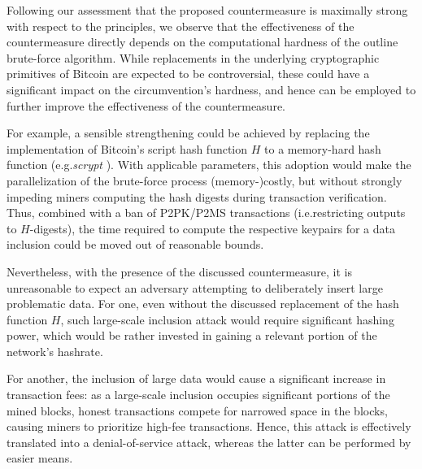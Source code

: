 \documentclass[a4paper,11pt,titlepage]{scrbook}
\begin{document}
Following our assessment that the proposed countermeasure is maximally strong with respect to the principles, we observe that the effectiveness of the countermeasure directly depends on the computational hardness of the outline brute-force algorithm.
While replacements in the underlying cryptographic primitives of Bitcoin are expected to be controversial, 
these could have a significant impact on the circumvention's hardness, and hence can be employed to further improve the effectiveness of the countermeasure.

For example, a sensible strengthening could be achieved by replacing the implementation of Bitcoin's script hash function $H$ to a memory-hard hash function (e.g.\@ \emph{scrypt} \cite{percival_scrypt}).
With applicable parameters, this adoption would make the parallelization of the brute-force process (memory-)costly, but without strongly impeding miners computing the hash digests during transaction verification.
Thus, combined with a ban of P2PK/P2MS transactions (i.e.\@ restricting outputs to $H$-digests), the time required to compute the respective keypairs for a data inclusion could be moved out of reasonable bounds.


Nevertheless, with the presence of the discussed countermeasure, it is unreasonable to expect an adversary attempting to deliberately insert large problematic data.
For one, even without the discussed replacement of the hash function $H$, such large-scale inclusion attack would require significant hashing power, which would be rather invested in gaining a relevant portion of the network's hashrate.

For another, the inclusion of large data would cause a significant increase in transaction fees:
as a large-scale inclusion occupies significant portions of the mined blocks, honest transactions compete for narrowed space in the blocks, causing miners to prioritize high-fee transactions.
Hence, this attack is effectively translated into a denial-of-service attack, whereas the latter can be performed by easier means.


\backmatter

 \label{listoffig}
\listoffigures
\cleardoublepage
{} \label{listoftab}
\listoftables

\cleardoublepage
{} \label{biblio}
\printbibliography[title=References]
\end{document}
